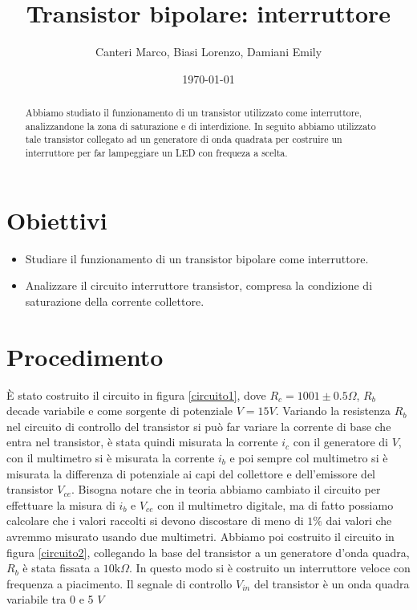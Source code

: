 \documentclass[letterpaper,11pt]{article}
\title{\textbf{Transistor bipolare:} interruttore}
\author{Canteri Marco, Biasi Lorenzo, Damiani Emily}
\date{\today}
\begin{document}
\maketitle

\begin{abstract}
\hspace{-1.5em}Abbiamo studiato il funzionamento di un transistor utilizzato come interruttore, analizzandone la zona di saturazione e di interdizione. In seguito abbiamo utilizzato tale transistor collegato ad un generatore di onda quadrata per costruire un interruttore per far lampeggiare un LED con frequeza a scelta.
\end{abstract}

\begin{body}
\section{Obiettivi}
\begin{itemize}
\item Studiare il funzionamento di un transistor bipolare come interruttore.
\item Analizzare il circuito interruttore transistor, compresa la condizione di saturazione della
corrente collettore.
\end{itemize}
\section{Procedimento}
È stato costruito il circuito in figura \eqref{circuito1}, dove $R_c = 1001 \pm 0.5 \Omega$, $R_b$ decade variabile e come sorgente di potenziale $V = 15 V$. Variando la resistenza $R_b$ nel circuito di controllo del transistor si può far variare la corrente di base che entra nel transistor, è stata quindi misurata la corrente $i_c$ con il generatore di $V$, con il multimetro si è misurata la corrente $i_b$ e poi sempre col multimetro si è misurata la differenza di potenziale ai capi del collettore e dell'emissore del transistor $V_{ce}$. Bisogna notare che in teoria abbiamo cambiato il circuito per effettuare la misura di $i_b$ e $V_{ce}$ con il multimetro digitale, ma di fatto possiamo calcolare che i valori raccolti si devono discostare di meno di $1 \%$ dai valori che avremmo misurato usando due multimetri.
Abbiamo poi costruito il circuito in figura \eqref{circuito2}, collegando la base del transistor a un generatore d'onda quadra, $R_b$ è stata fissata a $10 \text{k}\Omega$. In questo modo si è costruito un interruttore veloce con frequenza a piacimento. Il segnale di controllo $V_{in}$ del transistor è un onda quadra variabile tra 0 e 5 $V$


\end{body}
\end{document}
